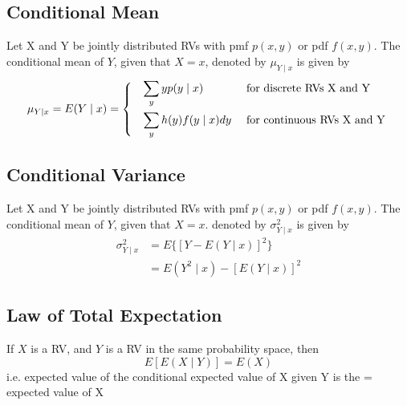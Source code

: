 \documentclass[a4paper]{article}
\begin{document}
\subsection{Conditional Mean}
Let X and Y be jointly distributed RVs with pmf $p(x, y)$ or pdf $f(x, y)$. The conditional mean of $Y$, given that $X = x$, denoted by $\mu_{Y\mid x}$ is given by
\begin{align*}
    \mu_{Y\mid x} = E(Y\mid x) = \begin{dcases*}
    \quad \sum_{y}yp(y\mid x) &\mbox{} \text{for discrete RVs X and Y} \\
    \quad \sum_{y}h(y)f(y\mid x) dy &\mbox{} \text{for continuous RVs X and Y}
    \end{dcases*}
\end{align*}
\subsection{Conditional Variance}
Let X and Y be jointly distributed RVs with pmf $p(x, y)$ or pdf $f(x, y)$. The conditional mean of $Y$, given that $X = x$. denoted by $\sigma^{2}_{Y\mid x}$ is given by
\begin{align*}
    \sigma^{2}_{Y\mid x} &= E\{[Y-E(Y\mid x)]^{2}\}\\
    &= E(Y^2\mid x) - [E(Y\mid x)]^2
\end{align*}
\subsection{Law of Total Expectation}
If $X$ is a RV, and $Y$ is a RV in the same probability space, then
$$E\left[E(X\mid Y)\right] = E(X)$$
i.e. expected value of the conditional expected value of X given Y is the =  expected value of X
\end{document}
